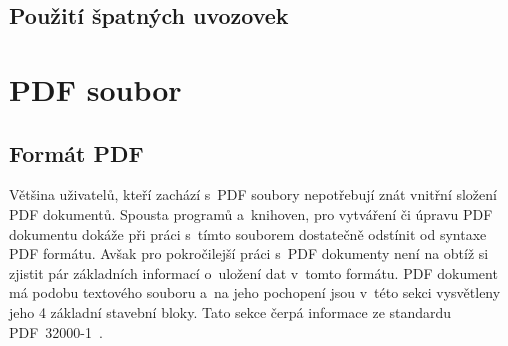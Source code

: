 
\section{Použití špatných uvozovek}
\dummyText
{}







\chapter{PDF soubor}

\dummyText



\section{Formát PDF}
Většina uživatelů, kteří zachází s~PDF soubory nepotřebují znát vnitřní složení
PDF dokumentů. Spousta programů a~knihoven, pro vytváření či úpravu PDF dokumentu
dokáže při práci s~tímto souborem dostatečně odstínit od syntaxe PDF formátu.
Avšak pro pokročilejší práci s~PDF dokumenty není na obtíž si zjistit pár
základních informací o~uložení dat v~tomto formátu.
PDF dokument má podobu textového souboru a~na jeho pochopení jsou v~této sekci
vysvětleny jeho 4 základní stavební bloky. Tato sekce čerpá informace ze
standardu PDF~32000-1~\cite{PDF32000-1:2008}.


